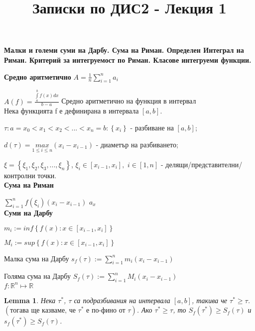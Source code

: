 \documentclass[12pt]{article}
\newtheorem{lemma}{Lemma}
\begin{document}
	\color{white}
	\pagecolor{darkgray}
	\title{Записки по ДИС2 - Лекция 1}
	\maketitle
	\begin{center}
		\Large
		\textbf{Малки и големи суми на Дарбу. Сума на Риман. Определен Интеграл на Риман. Критерий за интегруемост по Риман. Класове интегруеми функции.}
	\end{center}
	\textbf{Средно аритметично}
	$A=\frac{1}{n}\sum _{i=1}^{n}{a}_{i}$
	
	
	$A\left(f\right)=\frac{\underset{a}{\overset{b}{\int }}f\left(x\right)dx}{b-a} $ Средно аритметично на функция в интервал
	\\
	
	Нека функцията f е дефинирана в интервала $\left[a, b\right]$.
	
	$\tau : a=x_{0}<x_{1}<x_{2}<...<x_{n}=b : \left\{x_{i}\right\}$ - разбиване на $\left[a, b\right]$;
	
	$d\left(\tau\right)=\underset{1\leq i\leq n}{max}\left(x_{i} - x_{i-1}\right)$ - диаметър на разбиването;
	
	$\xi = \left\{\xi_{1}, \xi_{2}, \xi_{3}, ..., \xi _{n}\right\}$, $\xi_{i} \in \left[x_{i-1}, x_{i}\right],$ $i \in \left[1, n\right]$ - делящи/представителни/контролни точки.
	\\ 
	
	\textbf{Сума на Риман}
	
	$\sum _{i=1}^{n} f\left(\xi _{i}\right)\left(x_{i} - x_{i-1}\right)$
	$a_{x}$
	\\
	
	\textbf{Суми на Дарбу}
	
	$m_{i} := inf\left\{f\left(x\right): x\in \left[x_{i-1}, x_{i}\right]\right\}$
	
	$M_{i} := sup\left\{f\left(x\right): x\in \left[x_{i-1}, x_{i}\right]\right\}$
	
	
	Малка сума на Дарбу 
	$s_{f}\left(\tau\right) := \sum _{i=1}^{n} m_{i}\left(x_{i}-x_{i-1}\right)$
	
	Голяма сума на Дарбу
	$S_{f}\left(\tau\right) := \sum _{i=1}^{n} M_{i}\left(x_{i}-x_{i-1}\right)$
	\\
	
	$f: \mathbb{R}^{n} \mapsto \mathbb{R}$
	\begin{lemma}
		Нека $\tau^{*}$, $\tau$ са подразбивания на интервала $\left[a, b\right]$, такива че  $\tau^{*} \geq \tau$. 
		$\left(\text{тогава ще казваме, че }  \tau^{*} \textbf{ е по-фино от } \tau\right)$. 
		Ако $\tau^{*} \geq \tau$, то $S_{f}\left(\tau^{*}\right) \geq S_{f}\left(\tau\right)$ и $s_{f}\left(\tau^{*}\right) \geq S_{f}\left(\tau\right)$.
		\\
	\end{lemma}
	
\end{document}
